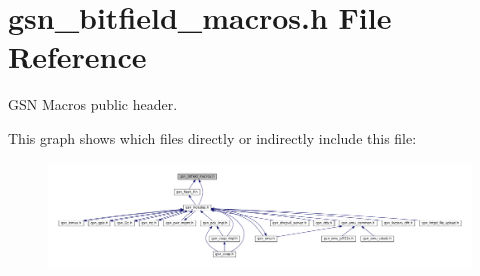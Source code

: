 \hypertarget{a00476}{
\section{gsn\_\-bitfield\_\-macros.h File Reference}
\label{a00476}
}


GSN Macros public header.  


This graph shows which files directly or indirectly include this file:
\nopagebreak
\begin{figure}[H]
\begin{center}
\leavevmode
\includegraphics[width=400pt]{a00700}
\end{center}
\end{figure}

